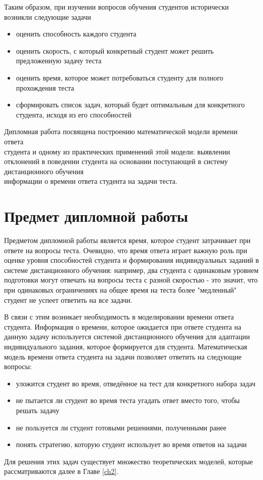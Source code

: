 Таким образом, при изучении вопросов обучения студентов исторически возникли следу\-ющие задачи
\begin{itemize}
\item оценить способность каждого студента
\item оценить скорость, с который конкретный студент может решить предложенную задачу теста
\item оценить время, которое может потребоваться студенту для полного прохождения теста
\item сформировать список задач, который будет оптимальным для конкретного студента, исходя из его способностей
\end{itemize}

Дипломная работа посвящена построению математической модели времени ответа\\ студента и одному из практических применений этой модели: выявлении отклонений в поведении студента на основании поступающей в систему дистанционного обучения\\ информации о времени ответа студента на задачи теста.

\section{Предмет дипломной работы}

Предметом дипломной работы является время, которое студент затрачивает при ответе на вопросы теста. Очевидно, что время ответа играет важную роль при оценке уровня способностей студента и формирования индивидуальных заданий в системе дистанционного обучения: например, два студента с одинаковым уровнем подготовки  могут отвечать на вопросы теста с разной скоростью - это значит, что при одинаковых ограничениях на общее время на теста более "медленный" студент не успеет ответить на все задачи.

В связи с этим возникает необходимость в моделировании времени ответа студента. Информация о времени, которое ожидается при ответе студента на данную задачу исполь\-зуется системой дистанционного обучения для адаптации индивидуального задания, кото\-рое формируется для студента. Математическая модель времени ответа студента на задачи позволяет ответить на следующие вопросы:
\begin{itemize}
\item уложится студент во время, отведённое на тест для конкретного набора задач
\item не пытается ли студент во время теста угадать ответ вместо того, чтобы решать задачу
\item не пользуется ли студент готовыми решениями, полученными ранее
\item понять стратегию, которую студент использует  во время ответов на задачи
\end{itemize}

Для решения этих задач существует множество теоретических моделей, которые\\ рассматриваются далее в Главе \ref{ch2}.
